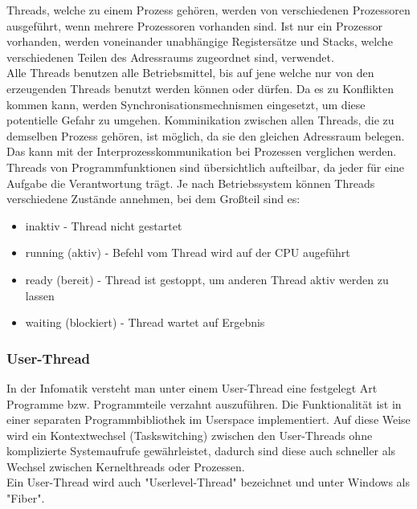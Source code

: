 \documentclass[12pt,a4paper]{report}
\begin{document}
\begin{onehalfspace}
Threads, welche zu einem Prozess gehören, werden von verschiedenen Prozessoren ausgeführt, wenn mehrere Prozessoren vorhanden sind. Ist nur ein Prozessor vorhanden, werden voneinander unabhängige Registersätze und Stacks, welche verschiedenen Teilen des Adressraums zugeordnet sind, verwendet.\\

Alle Threads benutzen alle Betriebsmittel, bis auf jene welche nur von den erzeugenden Threads benutzt werden können oder dürfen. Da es zu Konflikten kommen kann, werden Synchronisationsmechnismen eingesetzt, um diese potentielle Gefahr zu umgehen.
Komminikation zwischen allen Threads, die zu demselben Prozess gehören, ist möglich, da sie den gleichen Adressraum belegen. Das kann mit der Interprozesskommunikation bei Prozessen verglichen werden.\\

Threads von Programmfunktionen sind übersichtlich aufteilbar, da jeder für eine Aufgabe die Verantwortung trägt.  Je nach Betriebssystem können Threads verschiedene Zustände annehmen, bei dem Großteil sind es: 
\begin{itemize}
\item inaktiv -  Thread nicht gestartet
\item running (aktiv) - Befehl vom Thread wird auf der CPU augeführt
\item ready (bereit) - Thread ist gestoppt, um anderen Thread aktiv werden zu lassen
\item waiting (blockiert) - Thread wartet auf Ergebnis
\end{itemize}

\subsubsection{User-Thread}
In der Infomatik versteht man unter einem User-Thread eine festgelegt Art Programme bzw. Programmteile verzahnt auszuführen. Die Funktionalität ist in einer separaten Programmbibliothek im Userspace implementiert. Auf diese Weise wird ein Kontextwechsel (Taskswitching) zwischen den User-Threads ohne komplizierte Systemaufrufe gewährleistet, dadurch sind diese auch schneller als Wechsel zwischen Kernelthreads oder Prozessen.\\
Ein User-Thread wird auch "{}Userlevel-Thread"{} bezeichnet und unter Windows als "{}Fiber"{}.



\end{onehalfspace}
\end{document}
